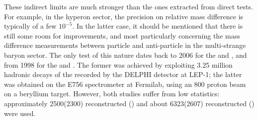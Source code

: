 These indirect limits are much stronger than the ones extracted from direct tests. For example, in the hyperon sector, the precision on relative mass difference is typically of a few $10^{-5}$. In the latter case, it should be mentioned that there is still some room for improvements, and most particularly concerning the mass difference measurements between particle and anti-particle in the multi-strange baryon sector. The only test of this nature dates back to 2006 \cite{abdallahMassesLifetimesProduction2006} for the \rmXiM and \rmAxiP, and from 1998 \cite{chanMeasurementPropertiesOverline1998} for the \rmOmegaM and \rmAomegaP. The former was achieved by exploiting 3.25 million hadronic decays of the \rmZzero recorded by the DELPHI detector at LEP-1; the latter was obtained on the E756 spectrometer at Fermilab, using an 800 \gmom proton beam on a beryllium target. However, both studies suffer from low statistics: approximately 2500(2300) reconstructed \rmXiM (\rmAxiP) and about 6323(2607) reconstructed \rmOmegaM (\rmAomegaP) were used.\\


